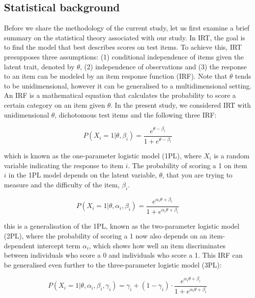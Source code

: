 \documentclass[Royal,sageapa,times,doublespace]{sagej}
\begin{document}
\subsection{Statistical background}
Before we share the methodology of the current study, let us first examine a brief summary on the statistical theory associated with our study. In IRT, the goal is to find the model that best describes scores on test items. To achieve this, IRT presupposes three assumptions: (1) conditional independence of items given the latent trait, denoted by $\theta$, (2) independence of observations and (3) the response to an item can be modeled by an item response function (IRF). Note that $\theta$ tends to be unidimensional, however it can be generalised to a multidimensional setting. An IRF is a mathematical equation that calculates the probability to score a certain category on an item given $\theta$. In the present study, we considered IRT with unidimensional $\theta$, dichotomous test items and the following three IRF:

\begin{equation}
P(X_i = 1 | \theta, \beta_{i}) = \frac{e^{\theta - \beta_{i}}}{1 + e^{\theta - \beta_{i}}}
\end{equation}

which is known as the one-parameter logistic model (1PL), where $X_i$ is a random variable indicating the response to item $i$. The probability of scoring a 1 on item $i$ in the 1PL model depends on the latent variable, $\theta$, that you are trying to measure and the difficulty of the item, $\beta_i$.

\begin{equation}
P(X_i = 1 | \theta, \alpha_{i}, \beta_{i}) = \frac{e^{\alpha_{i}\theta + \beta_{i}}}{1 + e^{\alpha_{i}\theta + \beta_{i}}}
\end{equation}

this is a generalisation of the 1PL, known as the two-parameter logistic model (2PL), where the probability of scoring a 1 now also depends on an item-dependent intercept term $\alpha_i$, which shows how well an item discriminates between individuals who score a 0 and individuals who score a 1. This IRF can be generalised even further to the three-parameter logistic model (3PL):

\begin{equation}
P(X_i = 1 | \theta, \alpha_{i}, \beta_{i}, \gamma_{i}) = \gamma_{i} + (1 - \gamma_{i}) \cdot 
\frac{e^{\alpha_{i}\theta + \beta_{i}}}{1 + e^{\alpha_{i}\theta + \beta_{i}}}
\end{equation}
\end{document}
